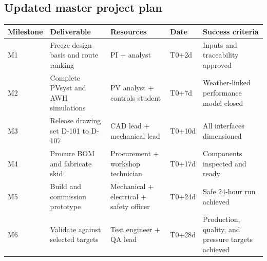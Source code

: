 \documentclass[11pt,a4paper]{article}
\begin{document}
\subsection{Updated master project plan}
\begin{table}[h]
\centering
\small
\begin{tabular}{@{}p{2.0cm}p{4.1cm}p{3.0cm}p{2.0cm}p{3.6cm}@{}}
\toprule
\textbf{Milestone} & \textbf{Deliverable} & \textbf{Resources} & \textbf{Date} & \textbf{Success criteria} \\
\midrule
M1 & Freeze design basis and route ranking & PI + analyst & T0+2d & Inputs and traceability approved \\
M2 & Complete PVsyst and AWH simulations & PV analyst + controls student & T0+7d & Weather-linked performance model closed \\
M3 & Release drawing set D-101 to D-107 & CAD lead + mechanical lead & T0+10d & All interfaces dimensioned \\
M4 & Procure BOM and fabricate skid & Procurement + workshop technician & T0+17d & Components inspected and ready \\
M5 & Build and commission prototype & Mechanical + electrical + safety officer & T0+24d & Safe 24-hour run achieved \\
M6 & Validate against selected targets & Test engineer + QA lead & T0+28d & Production, quality, and pressure targets achieved \\
\bottomrule
\end{tabular}
\end{table}
\end{document}
